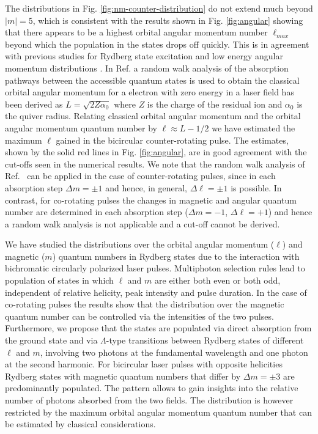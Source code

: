 The distributions in Fig. \ref{fig:nm-counter-distribution} do not extend much beyond $|m| = 5$, which is consistent with the results shown in Fig. \ref{fig:angular} showing that there appears to be a highest orbital angular momentum number $\ell_{max}$ beyond which the population in the states drops off quickly. This is in agreement with previous studies for Rydberg state excitation \cite{piraux2017,venzke2018_ryd} and low energy angular momentum distributions \cite{arbo2008}. In Ref. \cite{arbo2008} a random walk analysis of the absorption pathways between the accessible quantum states is used to obtain the classical orbital angular momentum for a electron with zero energy in a laser field has been derived as $L = \sqrt{2Z\alpha_0}$
where $Z$ is the charge of the residual ion and $\alpha_0$ is the quiver radius. Relating classical orbital angular momentum and the orbital angular momentum quantum number by $\ell \approx L - 1/2$ we have estimated the maximum $\ell$ gained in the bicircular counter-rotating pulse. The estimates, shown by the solid red lines in Fig. \ref{fig:angular}, are in good agreement with the cut-offs seen in the numerical results. We note that the random walk analysis of Ref.\ \cite{arbo2008} can be applied in the case of counter-rotating pulses, since in each absorption step $\Delta m = \pm 1$ and hence, in general, $\Delta \ell = \pm 1$ is possible. In contrast, for co-rotating pulses the changes in magnetic and angular quantum number are determined in each absorption step ($\Delta m = -1$, $\Delta \ell = +1$) and hence a random walk analysis is not applicable and a cut-off cannot be derived.


We have studied the distributions over the orbital angular momentum ($\ell$) and magnetic ($m$) quantum numbers in Rydberg states due to the interaction with bichromatic circularly polarized laser pulses. Multiphoton selection rules lead to population of states in which $\ell$ and $m$ are either both even or both odd, independent of relative helicity, peak intensity and pulse duration. In the case of co-rotating pulses the results show that the distribution over the magnetic quantum number can be controlled via the intensities of the two pulses. Furthermore, we propose that the states are populated via direct absorption from the ground state and via $\Lambda$-type transitions between Rydberg states of different $\ell$ and $m$, involving two photons at the fundamental wavelength and one photon at the second harmonic. For bicircular laser pulses with opposite helicities Rydberg states with magnetic quantum numbers that differ by $\Delta m = \pm 3$ are predominantly populated. The pattern allows to gain insights into the relative number of photons absorbed from the two fields. The distribution is however restricted by the maximum orbital angular momentum quantum number that can be estimated by classical considerations.

